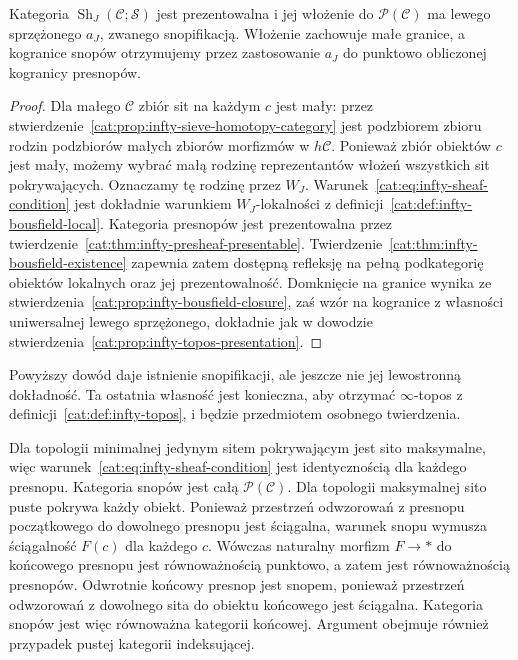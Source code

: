 \begin{stwierdzenie}\label{cat:prop:infty-sheaf-localization}
Kategoria $\operatorname{Sh}_J(\mathcal C;\mathcal S)$ jest prezentowalna i jej włożenie do $\mathcal P(\mathcal C)$ ma lewego sprzężonego $a_J$, zwanego snopifikacją. Włożenie zachowuje małe granice, a kogranice snopów otrzymujemy przez zastosowanie $a_J$ do punktowo obliczonej kogranicy presnopów.
\end{stwierdzenie}
\begin{proof}
Dla małego $\mathcal C$ zbiór sit na każdym $c$ jest mały: przez stwierdzenie~\ref{cat:prop:infty-sieve-homotopy-category} jest podzbiorem zbioru rodzin podzbiorów małych zbiorów morfizmów w $h\mathcal C$. Ponieważ zbiór obiektów $c$ jest mały, możemy wybrać małą rodzinę reprezentantów włożeń wszystkich sit pokrywających. Oznaczamy tę rodzinę przez $W_J$. Warunek~\eqref{cat:eq:infty-sheaf-condition} jest dokładnie warunkiem $W_J$-lokalności z definicji~\ref{cat:def:infty-bousfield-local}. Kategoria presnopów jest prezentowalna przez twierdzenie~\ref{cat:thm:infty-presheaf-presentable}. Twierdzenie~\ref{cat:thm:infty-bousfield-existence} zapewnia zatem dostępną refleksję na pełną podkategorię obiektów lokalnych oraz jej prezentowalność. Domknięcie na granice wynika ze stwierdzenia~\ref{cat:prop:infty-bousfield-closure}, zaś wzór na kogranice z własności uniwersalnej lewego sprzężonego, dokładnie jak w dowodzie stwierdzenia~\ref{cat:prop:infty-topos-presentation}.
\end{proof}

Powyższy dowód daje istnienie snopifikacji, ale jeszcze nie jej lewostronną dokładność. Ta ostatnia własność jest konieczna, aby otrzymać $\infty$-topos z definicji~\ref{cat:def:infty-topos}, i będzie przedmiotem osobnego twierdzenia.

\begin{przyklad}\label{cat:ex:infty-sheaf-extreme}
Dla topologii minimalnej jedynym sitem pokrywającym jest sito maksymalne, więc warunek~\eqref{cat:eq:infty-sheaf-condition} jest identycznością dla każdego presnopu. Kategoria snopów jest całą $\mathcal P(\mathcal C)$. Dla topologii maksymalnej sito puste pokrywa każdy obiekt. Ponieważ przestrzeń odwzorowań z presnopu początkowego do dowolnego presnopu jest ściągalna, warunek snopu wymusza ściągalność $F(c)$ dla każdego $c$. Wówczas naturalny morfizm $F\to *$ do końcowego presnopu jest równoważnością punktowo, a zatem jest równoważnością presnopów. Odwrotnie końcowy presnop jest snopem, ponieważ przestrzeń odwzorowań z dowolnego sita do obiektu końcowego jest ściągalna. Kategoria snopów jest więc równoważna kategorii końcowej. Argument obejmuje również przypadek pustej kategorii indeksującej.
\end{przyklad}

